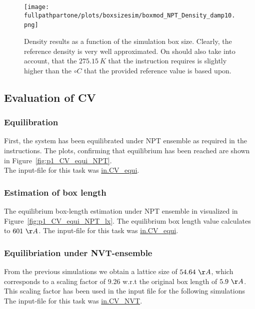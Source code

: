 \documentclass[10pt,a4paper]{report}
\def \pathpartone {../../1_three-dimensional_atomic_system}
\def \fullpathpartone {/home/lukas/Desktop/project/independence/atomistic_modeling/exam/1_three-dimensional_atomic_system}
\begin{document}
\begin{center}
\begin{figure}[h]
\texttt{[image: \\fullpathpartone/plots/boxsizesim/boxmod\_NPT\_Density\_damp10.png]}~
\caption[aaa]{Density results as a function of the simulation box size. Clearly, the reference density is very well approximated. On should also take into account, that the $275.15~K$ that the instruction requires is slightly higher than the $\circ C$ that the provided reference value is based upon.}
\label{fig:pressure_over_atomnum}
\end{figure}
\end{center}







\subsection{Evaluation of CV}

\subsubsection{Equilibration}
First, the system has been equilibrated under NPT ensemble as required in the instructions. The plots, confirming that equilibrium has been reached are shown in Figure~\ref{fig:p1_CV_equi_NPT}.\\
The input-file for this task was \href{\pathpartone/in.CV_equi}{in.CV\_equi}.


\subsubsection{Estimation of box length}
The equilibrium box-length estimation under NPT ensemble in visualized in Figure~\ref{fig:p1_CV_equi_NPT_lx}. The equilibrium box length value calculates to $601~\AA$.
The input-file for this task was \href{\pathpartone/in.CV_equi}{in.CV\_equi}.

\subsubsection{Equilibriation under NVT-ensemble}
From the previous simulations we obtain a lattice size of $54.64~\AA$, which corresponds to a scaling factor of $9.26$ w.r.t the original box length of $5.9~\AA$.\\
This scaling factor has been used in the input file for the following simulations The input-file for this task was \href{\pathpartone/in.CV_NVT}{in.CV\_NVT}.
\end{document}
